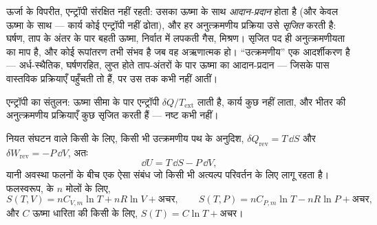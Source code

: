 \begin{remark}[नियम को पढ़ना]\label{rem:b1:second-law-entropy:reading}
ऊर्जा के विपरीत, एन्ट्रॉपी संरक्षित नहीं रहती: उसका ऊष्मा के साथ
\emph{आदान-प्रदान} होता है (और केवल ऊष्मा के साथ --- कार्य कोई एन्ट्रॉपी
नहीं ढोता), और हर अनुत्क्रमणीय प्रक्रिया उसे \emph{सृजित} करती है: घर्षण,
ताप के अंतर के पार बहती ऊष्मा, निर्वात में लपकती गैस, मिश्रण। सृजित पद ही
अनुत्क्रमणीयता का माप है, और कोई रूपांतरण तभी संभव है जब वह अऋणात्मक हो।
``उत्क्रमणीय'' एक आदर्शीकरण है --- अर्ध-स्थैतिक, घर्षणरहित, लुप्त होते
ताप-अंतरों के पार ऊष्मा का आदान-प्रदान --- जिसके पास वास्तविक प्रक्रियाएँ
पहुँचती तो हैं, पर उस तक कभी नहीं आतीं।
\end{remark}

\begin{omfigure}

{\small एन्ट्रॉपी का संतुलन: ऊष्मा सीमा के पार एन्ट्रॉपी $\delta Q/T_{\mathrm{ext}}$
लाती है, कार्य कुछ नहीं लाता, और भीतर की अनुत्क्रमणीय प्रक्रियाएँ कुछ
सृजित करती हैं --- नष्ट कभी नहीं।}
\end{omfigure}

\begin{proposition}\label{prop:b1:second-law-entropy:identity}
नियत संघटन वाले किसी  के लिए, किसी भी उत्क्रमणीय पथ के अनुदिश,
$\delta Q_{\mathrm{rev}} = T\,\dd S$ और $\delta W_{\mathrm{rev}} = -P\,\dd V$, अतः
\[
\dd U = T\,\dd S - P\,\dd V ,
\]
यानी अवस्था फलनों के बीच एक ऐसा संबंध जो किसी भी अत्यल्प परिवर्तन के लिए
लागू रहता है। फलस्वरूप,  के $n$ मोलों के लिए,
\[
S(T, V) = nC_{V,m}\ln T + nR\ln V + \text{अचर}, \qquad
S(T, P) = nC_{P,m}\ln T - nR\ln P + \text{अचर},
\]
और $C$ ऊष्मा धारिता की किसी  के लिए, $S(T) = C\ln T + \text{अचर}$।
\end{proposition}

